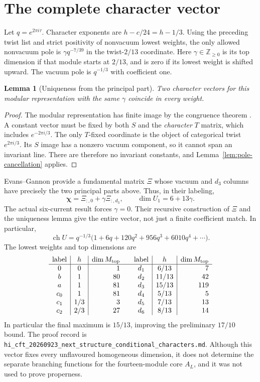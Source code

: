 \documentclass[11pt,a4paper]{article}
\newtheorem{lemma}[theorem]{Lemma}
\theoremstyle{definition}
\newcommand{\artifact}[1]{\textnormal{\nolinkurl{#1}}}
\begin{document}
\section{The complete character vector}
\label{sec:characters}

Let $q=e^{2\pi i\tau}$. Character exponents are $h-c/24=h-1/3$.
Using the preceding twist list and strict positivity of nonvacuum
lowest weights, the only allowed nonvacuum pole is
$\gamma q^{-7/39}$ in the twist-$2/13$ coordinate. Here
$\gamma\in\mathbb Z_{\ge0}$ is its top dimension if that module starts
at $2/13$, and is zero if its lowest weight is shifted upward. The
vacuum pole is $q^{-1/3}$ with coefficient one.

\begin{lemma}[Uniqueness from the principal part]\label{lem:haagerup-character-unique}
Two character vectors for this modular representation with the same
$\gamma$ coincide in every weight.
\end{lemma}
\begin{proof}
The modular representation has finite image by the congruence theorem
\cite[Theorem~I]{DLN}. A constant vector must be fixed by both $S$ and
the \emph{character} $T$ matrix, which
includes $e^{-2\pi i/3}$. The only $T$-fixed coordinate is the object
of categorical twist $e^{2\pi i/3}$. Its $S$ image has a nonzero vacuum
component, so it cannot span an invariant line. There are therefore
no invariant constants, and Lemma~\ref{lem:pole-cancellation} applies.
\end{proof}

Evans--Gannon \cite[Sections~1.4 and~2.4, equation~(2.7)]{EG}
provide a fundamental matrix $\Xi$ whose
vacuum and $d_3$ columns have precisely the two principal parts above.
Thus, in their labeling,
\[
 \boldsymbol\chi=\Xi_{:,0}+\gamma\Xi_{:,d_3},
 \qquad\dim U_1=6+13\gamma.
\]
The actual six-current result forces $\gamma=0$. Their recursive
construction of $\Xi$ and the uniqueness lemma give the entire vector,
not just a finite coefficient match. In particular,
\begin{equation}
 \operatorname{ch}U
 =q^{-1/3}\bigl(1+6q+120q^2+956q^3+6010q^4+\cdots\bigr).
 \label{eq:vacuum-character}
\end{equation}
The lowest weights and top dimensions are
\[
\begin{array}{c|c|r@{\qquad}c|c|r}
 \text{label}&h&\dim M_{\rm top}&\text{label}&h&\dim M_{\rm top}\\\hline
 0&0&1&d_1&6/13&7\\
 b&1&80&d_2&11/13&42\\
 a&1&81&d_3&15/13&119\\
 c_0&1&81&d_4&5/13&5\\
 c_1&1/3&3&d_5&7/13&13\\
 c_2&2/3&27&d_6&8/13&14
\end{array}
\]
In particular the final maximum is $15/13$, improving the preliminary
$17/10$ bound. The proof record is
\artifact{hi_cft_20260923_next_structure_conditional_characters.md}.
Although this vector fixes every unflavoured homogeneous dimension,
it does not determine the separate branching functions for the
fourteen-module core $A_L$, and it was not used to prove properness.
\end{document}
